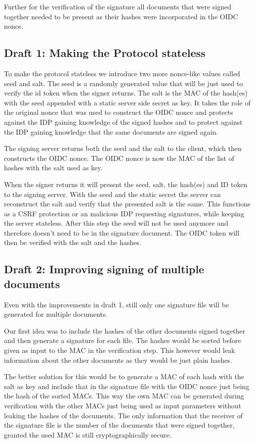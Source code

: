 Further for the verification of the signature all documents that were signed together needed to be present as their hashes were incorporated in the \gls{OIDC} nonce.

\subsection{Draft 1: Making the Protocol stateless}
To make the protocol stateless we introduce two more nonce-like values called seed and salt.
The seed is a randomly generated value that will be just used to verify the id token when the signer returns.
The salt is the \gls{MAC} of the hash(es) with the seed appended with a static server side secret as key.
It takes the role of the original nonce that was used to construct the \gls{OIDC} nonce and protects against the \gls{IDP} gaining knowledge of the signed hashes and to protect against the \gls{IDP} gaining knowledge that the same documents are signed again.

The signing server returns both the seed and the salt to the client, which then constructs the \gls{OIDC} nonce.
The \gls{OIDC} nonce is now the \gls{MAC} of the list of hashes with the salt used as key.

When the signer returns it will present the seed, salt, the hash(es) and ID token to the signing server.
With the seed and the static secret the server can reconstruct the salt and verify that the presented salt is the same.
This functions as a \gls{CSRF} protection or an malicious \gls{IDP} requesting signatures, while keeping the server stateless.
After this step the seed will not be used anymore and therefore doesn't need to be in the signature document.
The \gls{OIDC} token will then be verified with the salt and the hashes.

\subsection{Draft 2: Improving signing of multiple documents}
Even with the improvements in draft 1, still only one signature file will be generated for multiple documents.

Our first idea was to include the hashes of the other documents signed together and then generate a signature for each file.
The hashes would be sorted before given as input to the \gls{MAC} in the verification step.
This however would leak information about the other documents as they would be just plain hashes.

The better solution for this would be to generate a \gls{MAC} of each hash with the salt as key and include that in the signature file with the \gls{OIDC} nonce just being the hash of the sorted \gls{MAC}s.
This way the own \gls{MAC} can be generated during verification with the other \gls{MAC}s just being used as input parameters without leaking the hashes of the documents.
The only information that the receiver of the signature file is the number of the documents that were signed together, granted the used \gls{MAC} is still cryptographically secure.

